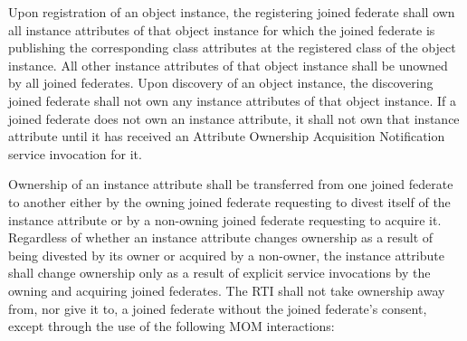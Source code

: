 \begin{compactstdpage}
    Upon registration of an object instance, the registering joined federate shall own all instance attributes of that object instance for which the joined federate is publishing the corresponding class attributes at the registered class of the object instance. All other instance attributes of that object instance shall be unowned by all joined federates. Upon discovery of an object instance, the discovering joined federate shall not own any instance attributes of that object instance. If a joined federate does not own an instance attribute, it shall not own that instance attribute until it has received an Attribute Ownership Acquisition Notification \rtiinitiated{} service invocation for it.


    Ownership of an instance attribute shall be transferred from one joined federate to another either by the owning joined federate requesting to divest itself of the instance attribute or by a non-owning joined federate requesting to acquire it. Regardless of whether an instance attribute changes ownership as a result of being divested by its owner or acquired by a non-owner, the instance attribute shall change ownership only as a result of explicit service invocations by the owning and acquiring joined federates. The RTI shall not take ownership away from, nor give it to, a joined federate without the joined federate's consent, except through the use of the following MOM interactions:



\end{compactstdpage}

\clearpage

\mbox{}\vfill


